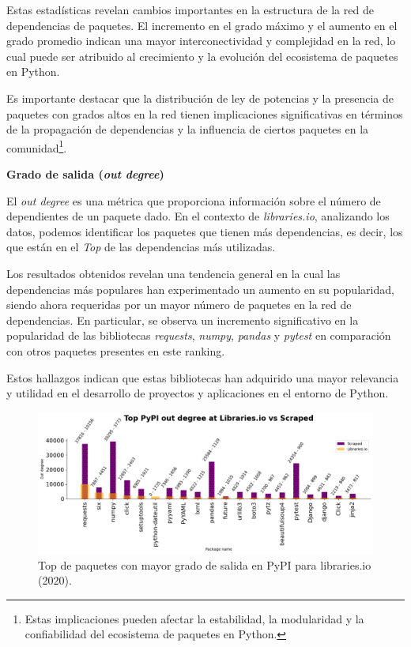 Estas estadísticas revelan cambios importantes en la estructura de la red de dependencias de paquetes.
El incremento en el grado máximo y el aumento en el grado promedio indican una mayor interconectividad
y complejidad en la red, lo cual puede ser atribuido al crecimiento y la evolución del ecosistema de
paquetes en Python.

Es importante destacar que la distribución de ley de potencias y la presencia de paquetes con grados
altos en la red tienen implicaciones significativas en términos de la propagación de dependencias y la
influencia de ciertos paquetes en la comunidad\footnote{Estas implicaciones pueden afectar la
    estabilidad, la modularidad y la confiabilidad del ecosistema de paquetes en Python.}.

\textbf{Grado de salida (\textit{out degree})}

El \textit{out degree} es una métrica que proporciona información
sobre el número de dependientes de un paquete dado. En el contexto de \textit{libraries.io},
analizando los datos, podemos identificar los paquetes que tienen más dependencias, es decir,
los que están en el \textit{Top} de las dependencias más utilizadas.


Los resultados obtenidos revelan una tendencia general en la cual las dependencias más populares han
experimentado un aumento en su popularidad, siendo ahora requeridas por un mayor número de paquetes
en la red de dependencias. En particular, se observa un incremento significativo en la popularidad
de las bibliotecas \textit{requests}, \textit{numpy}, \textit{pandas} y \textit{pytest} en comparación
con otros paquetes presentes en este ranking.

Estos hallazgos indican que estas bibliotecas han adquirido una mayor relevancia y utilidad en el
desarrollo de proyectos y aplicaciones en el entorno de Python.

\begin{figure}[h!]
    \begin{center}
        \includegraphics[width=1\textwidth]{img/pypi/libio_t20_outd_comparison.png}
        \caption{Top de paquetes con mayor grado de salida en PyPI para libraries.io (2020).}
        \label{fig:pypi_libio_outd_comparison}
    \end{center}
\end{figure}

